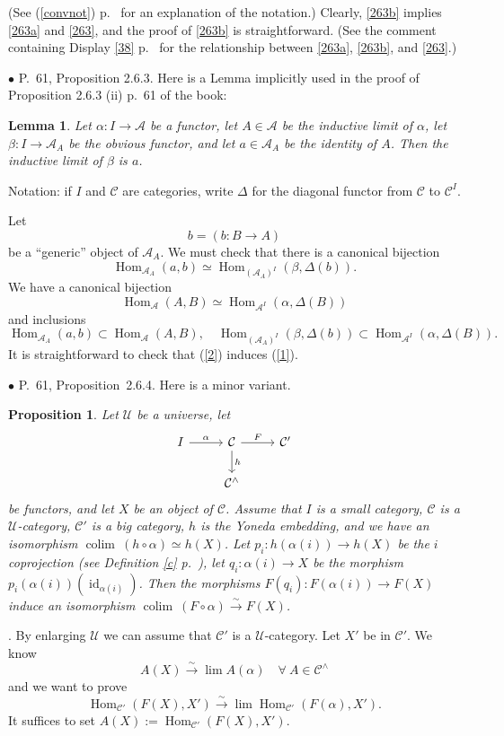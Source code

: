 \documentclass[12pt]{article}
\newtheorem{lem}[thm]{Lemma}
\newtheorem{prop}[thm]{Proposition}
\theoremstyle{remark}%
\newcommand{\bu}{\bullet}
\newcommand{\n}{\noindent}
\newcommand{\A}{\mathcal A}
\newcommand{\C}{\mathcal C}
\newcommand{\U}{\mathcal U}
\newcommand{\bp}{\begin{prop}}
\newcommand{\ep}{\end{prop}}
\newcommand{\pr}{Proposition}
\newcommand{\cn}{(See (\ref{convnot}) p.~\pageref{convnot} for an explanation of the notation.) }
\DeclareMathOperator*{\co}{colim}
\DeclareMathOperator{\id}{id}
\DeclareMathOperator{\Hom}{Hom}
\DeclareMathOperator{\h}{Hom}
\begin{document}
\n\cn Clearly, \eqref{263b} implies \eqref{263a} and \eqref{263}, and the proof of \eqref{263b} is straightforward. (See the comment containing Display \eqref{38} p.~\pageref{38} for the relationship between \eqref{263a}, \eqref{263b}, and \eqref{263}.) 


\n$\bu$ P.~61, Proposition 2.6.3. Here is a Lemma implicitly used in the proof of Proposition 2.6.3 (ii) p.~61 of the book: 
% 
\begin{lem} 
Let $\alpha:I\to\A$ be a functor, let $A\in\A$ be the inductive limit of $\alpha$, let $\beta:I\to\A_A$ be the obvious functor, and let $a\in\A_A$ be the identity of $A$. Then the inductive limit of $\beta$ is $a$. 
\end{lem} 
%
\n{\em Proof.} Notation: if $I$ and $\C$ are categories, write $\Delta$ for the diagonal functor from $\C$ to $\C^I$. 

Let
$$
b=(b:B\to A)
$$
be a ``generic'' object of $\A_A$. We must check that there is a canonical bijection
%
\begin{equation}\label{1}
\Hom_{\A_A}(a,b)\simeq\Hom_{(\A_A)^I}(\beta,\Delta(b)).
\end{equation}
%
We have a canonical bijection  
%
\begin{equation}\label{2}
\Hom_\A(A,B)\simeq\Hom_{\A^I}(\alpha,\Delta(B))
\end{equation}
%
and inclusions  
$$
\Hom_{\A_A}(a,b)\subset\Hom_\A(A,B),\quad
%
\Hom_{(\A_A)^I}(\beta,\Delta(b))\subset\Hom_{\A^I}(\alpha,\Delta(B)).
$$
It is straightforward to check that (\ref{2}) induces (\ref{1}). 


\n$\bu$ P.~61, \pr\ 2.6.4. Here is a minor variant. 
%
\bp\label{264}
Let $\U$ be a universe, let  
$$
\begin{tikzcd}
I\ar{r}{\alpha}&\C\ar{d}{h}\ar{r}{F}&\C'\\
&\C^\wedge
\end{tikzcd}
$$ 
be functors, and let $X$ be an object of $\C$. Assume that $I$ is a small category, $\C$ is a $\U$-category, $\C'$ is a big category, $h$ is the Yoneda embedding, and we have an isomorphism $\co\ (h\circ\alpha)\simeq h(X)$. Let $p_i:h(\alpha(i))\to h(X)$ be the $i$ coprojection (see Definition \ref{c} p.~\pageref{c}), let $q_i:\alpha(i)\to X$ be the morphism $p_i(\alpha(i))(\id_{\alpha(i)})$. Then the morphisms $F(q_i):F(\alpha(i))\to F(X)$ induce an isomorphism $\co\ (F\circ\alpha)\xrightarrow\sim F(X)$.  
\ep
% 
\n{\em Proof}. By enlarging $\U$ we can assume that $\C'$ is a $\U$-category. Let $X'$ be in $\C'$. We know 
$$
A(X)\xrightarrow\sim\lim A(\alpha)\quad\forall\ A\in\C^\wedge 
$$ 
and we want to prove 
$$
\h_{\C'}(F(X),X')\xrightarrow\sim\lim\h_{\C'}(F(\alpha),X'). 
$$ 
It suffices to set $A(X):=\h_{\C'}(F(X),X')$. 
\end{document}
